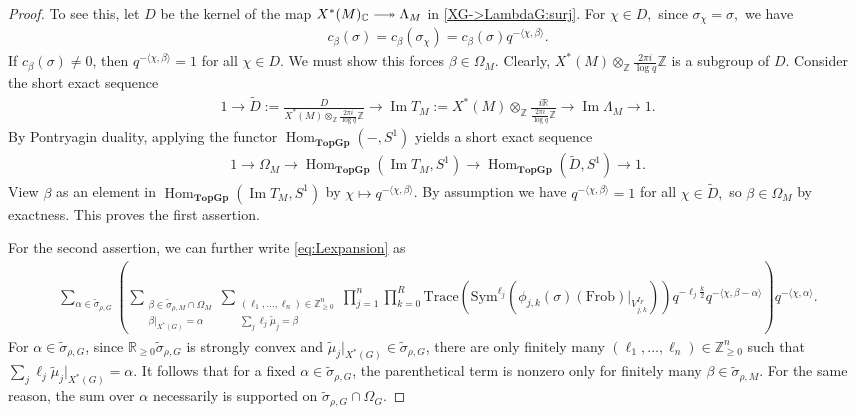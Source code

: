 \documentclass[10pt]{amsart}
\theoremstyle{definition}
\numberwithin{equation}{section}
\DeclareMathOperator{\Hom}{\mathrm{Hom}}
\numberwithin{equation}{subsection}
\newcommand{\ZZ}{\mathbb{Z}}
\newcommand{\RR}{\mathbb{R}}
\newcommand{\CC}{\mathbb{C}}
\renewcommand{\Im}{\mathop{\mathrm{Im}}}
\begin{document}
\begin{proof}
To see this, let $D$ be the kernel of the map $X^*(M)_\CC\relbar\joinrel\twoheadrightarrow \Lambda_M$ in \eqref{XG->LambdaG:surj}. For $\chi\in D,$ since $\sigma_{\chi} = \sigma,$  we have
\begin{align*}
    c_\beta(\sigma) = c_\beta(\sigma_\chi) = c_\beta(\sigma) q^{-\langle\chi,\beta\rangle}.
\end{align*}
If $c_\beta(\sigma)\neq 0$, then $q^{-\langle\chi,\beta\rangle} = 1$ for all $\chi\in D$. We must show this forces $\beta\in \Omega_M$. Clearly, $X^*(M)\otimes_\ZZ \tfrac{2\pi i}{\log q}\ZZ$ is a subgroup of $D$. Consider the short exact sequence
\begin{align*}
    1\longrightarrow \widetilde{D}:=\frac{D}{X^*(M)\otimes_\ZZ \tfrac{2\pi i}{\log q}\ZZ}\longrightarrow \Im T_M:=X^*(M)\otimes_\ZZ \frac{i\RR}{\tfrac{2\pi i}{\log q}\ZZ} \longrightarrow \Im\Lambda_M\longrightarrow 1.
\end{align*}
By Pontryagin duality, applying the functor $\Hom_{\textbf{TopGp}}(-,S^1)$ yields a short exact sequence
\begin{align*}
    1\longrightarrow \Omega_M\longrightarrow \Hom_{\textbf{TopGp}}(\Im T_M,S^1)\longrightarrow  \Hom_{\textbf{TopGp}}(\widetilde{D},S^1)\longrightarrow  1.
\end{align*}
View $\beta$ as an element in $\Hom_{\textbf{TopGp}}(\Im T_M,S^1)$ by $\chi\mapsto q^{-\langle\chi,\beta\rangle}$. By assumption we have $q^{-\langle\chi,\beta\rangle}=1$ for all $\chi\in \widetilde{D},$ so $\beta\in \Omega_M$ by exactness. This proves the first assertion.

For the second assertion, we can further write \eqref{eq:Lexpansion} as
\begin{align}\label{eq:Lexpansion:2}
    \sum_{\alpha\in\widetilde{\sigma}_{\rho,G}}\left(\sum_{\substack{\beta\in \widetilde{\sigma}_{\rho,M}\cap \Omega_M\\\beta\vert_{X^*(G)}=\alpha}} \sum_{\substack{(\ell_1,\ldots,\ell_n)\in\mathbb{Z}_{\geq 0}^n\\
    \sum_j\ell_j\widetilde{\mu}_j = \beta}} \prod_{j=1}^n\prod_{k=0}^R  \mathrm{Trace}\left(\mathrm{Sym}^{\ell_j}\left(\phi_{j,k}(\sigma)(\mathrm{Frob})\big|_{V_{j,k}^{I_F}}\right)\right)q^{-\ell_j\frac{k}{2}}q^{-\langle\chi,\beta-\alpha\rangle}\right) q^{-\langle\chi,\alpha\rangle}.
\end{align}
For $\alpha\in\widetilde{\sigma}_{\rho,G}$, since $\mathbb{R}_{\geq 0}\widetilde{\sigma}_{\rho,G}$ is strongly convex and $\widetilde{\mu}_j\vert_{X^*(G)}\in \widetilde{\sigma}_{\rho,G}$, there are only finitely many $(\ell_1,\ldots,\ell_n)\in\mathbb{Z}^n_{\geq 0}$ such that $\sum_j\ell_j\widetilde{\mu}_j\vert_{X^*(G)} = \alpha$. It follows that for a fixed $\alpha\in\widetilde{\sigma}_{\rho,G}$, the parenthetical term is nonzero only for finitely many $\beta\in\widetilde{\sigma}_{\rho,M}$. For the same reason, the sum over $\alpha$ necessarily is supported on $\widetilde{\sigma}_{\rho,G}\cap \Omega_G.$

\end{proof}
\end{document}
